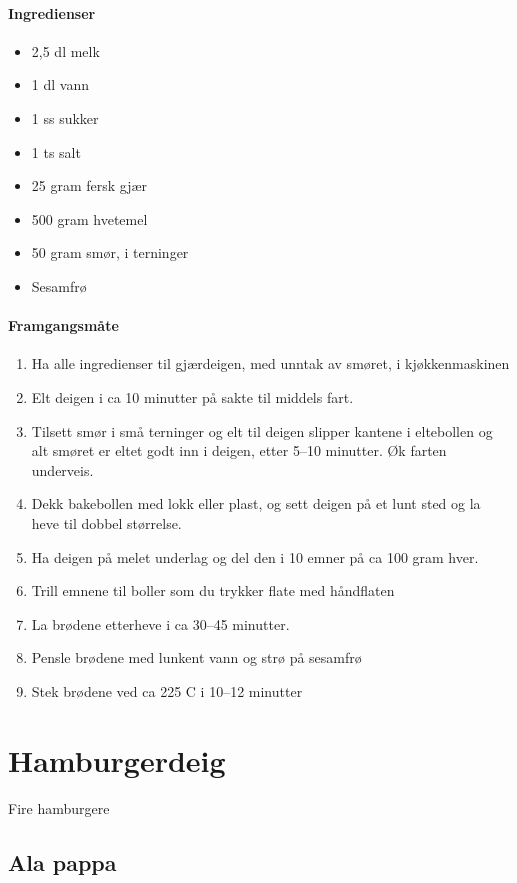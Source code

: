\documentclass[12pt,a4paper]{book}
\begin{document}
\paragraph{Ingredienser}
\begin{itemize}[noitemsep]
		\item 2,5 dl melk
		\item 1 dl vann
		\item 1 ss sukker
		\item 1 ts salt
		\item 25 gram fersk gjær
		\item 500 gram hvetemel
		\item 50 gram smør, i terninger
		\item Sesamfrø
\end{itemize}

\paragraph{Framgangsmåte}
\begin{enumerate}[noitemsep]
	\item Ha alle ingredienser til gjærdeigen, med unntak av smøret, i kjøkkenmaskinen
	\item Elt deigen i ca 10 minutter på sakte til middels fart.
	\item Tilsett smør i små terninger og elt til deigen slipper kantene i eltebollen og alt smøret er eltet godt inn i deigen, etter 5--10 minutter. Øk farten underveis.
	\item Dekk bakebollen med lokk eller plast, og sett deigen på et lunt sted og la heve til dobbel størrelse.
	\item Ha deigen på melet underlag og del den i 10 emner på ca 100 gram hver.
	\item Trill emnene til boller som du trykker flate med håndflaten
	\item La brødene etterheve i ca 30--45 minutter.
	\item Pensle brødene med lunkent vann og strø på sesamfrø
	\item Stek brødene ved ca 225 \degree C i 10--12 minutter
\end{enumerate}
\clearpage{}
\clearpage{}\section{﻿Hamburgerdeig}
Fire hamburgere

\subsection{Ala pappa}
\end{document}
